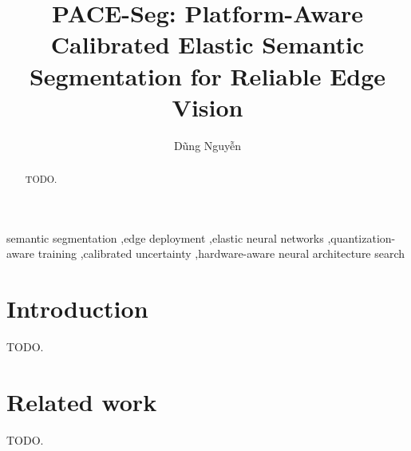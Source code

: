 \documentclass[a4paper,review,12pt]{elsarticle}
\begin{document}
\begin{frontmatter}

\title{PACE-Seg: Platform-Aware Calibrated Elastic Semantic Segmentation for Reliable Edge Vision}

\author{D\~ung Nguy\~ên}

\begin{abstract}
TODO.
\end{abstract}

\begin{keyword}
semantic segmentation \sep edge deployment \sep elastic neural networks \sep quantization-aware training \sep calibrated uncertainty \sep hardware-aware neural architecture search
\end{keyword}

\end{frontmatter}

\section{Introduction}
TODO.

\section{Related work}
TODO.
\end{document}
